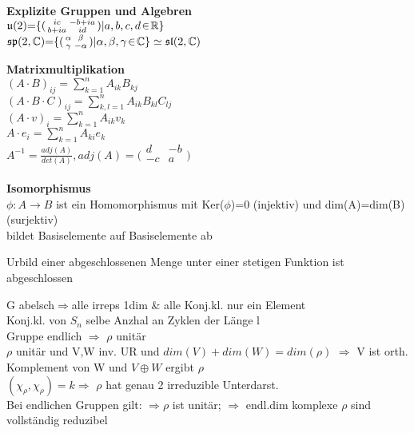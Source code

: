 \documentclass[8pt, a4paper, landscape]{extarticle}
\newcommand{\tit}[1]{\textbf{#1} \\}
\newcommand{\R}{\mathbb{R}}
\newcommand{\C}{\mathbb{C}}
\newcommand{\eq}{\negthickspace=\negthickspace}
\newcommand{\hi}[1]{\textcolor{Cerulean}{#1}}
\newcommand{\eck}[1]{\mathfrak{#1}}
\begin{document}
\begin{multicols*}{5}
\begin{ibox}
\tit{Explizite Gruppen und Algebren}
$\eck{u}(2)\eq\{(\begin{smallmatrix}
    ic & -b+ia\\
    b+ia & id \\
    \end{smallmatrix})|a,b,c,d\negthinspace\in\negthinspace \R\}$\\
$\eck{sp}(2,\C)\eq\{(\begin{smallmatrix}
    \alpha & \beta\\
    \gamma & -\alpha \\
    \end{smallmatrix})|\alpha,\beta,\gamma\negthinspace\in\negthinspace \C\}\simeq\eck{sl}(2,\C)$
\end{ibox}
\begin{ibox}
    \tit{Matrixmultiplikation}
    \textbullet $(A\cdot B)_{ij}=\sum_{k=1}^nA_{ik}B_{kj}$ \\
    \textbullet $(A\cdot B\cdot C)_{ij}=\sum_{k,l=1}^nA_{ik}B_{kl}C_{lj}$\\
    \textbullet $(A\cdot v)_i=\sum_{k=1}^nA_{ik}v_k$\\
    \textbullet $A\cdot e_i=\sum_{k=1}^nA_{ki}e_k$\\
    \textbullet $ A^{-1} = \frac{adj(A)}{det(A)}, adj(A) = \big(\begin{smallmatrix}
    d & -b \\
    -c & a\\
    \end{smallmatrix}\big)$
\end{ibox}
\begin{ibox}
    \tit{Isomorphismus}
    \textbullet $\phi: A \rightarrow B$ ist ein Homomorphismus mit Ker($\phi$)={0} (injektiv) und dim(A)=dim(B) (surjektiv)\\
    \textbullet bildet Basiselemente auf Basiselemente ab
\end{ibox}
\begin{ibox}
Urbild einer abgeschlossenen Menge unter einer stetigen Funktion ist abgeschlossen
\end{ibox}
\begin{ibox}
    \textbullet G abelsch$\Rightarrow$alle irreps 1dim \& alle Konj.kl. nur ein Element\\
    \textbullet Konj.kl. von $S_n$ selbe Anzhal an Zyklen der Länge l\\
    \textbullet Gruppe endlich $\Rightarrow$ $\rho$ unitär\\
    \textbullet $\rho$ unitär und V,W inv. UR und $dim(V)+dim(W)=dim(\rho)$ $\Rightarrow$ V ist orth. Komplement von W und $V \oplus W $ ergibt $ \rho$\\
    \textbullet $(\chi_\rho,\chi_\rho)=k\Rightarrow$ $\rho$ hat genau 2 irreduzible Unterdarst.\\
    \textbullet Bei endlichen Gruppen gilt: $\Rightarrow \rho$ ist unitär; $\Rightarrow$ \hi{endl.dim komplexe $\rho$} sind vollständig reduzibel\\
\end{ibox}


\end{multicols*}
\end{document}
